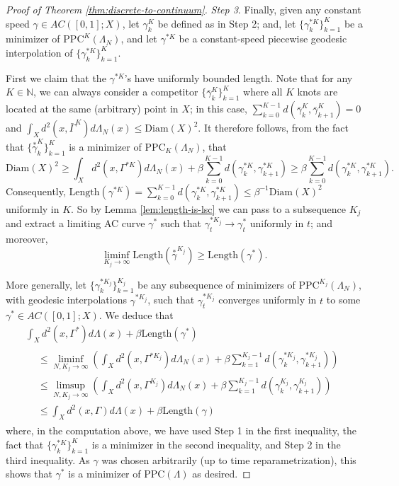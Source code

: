 \documentclass[aos, preprint]{imsart}
\theoremstyle{plain}
\theoremstyle{remark}
\begin{document}
\begin{appendix}
\begin{proof}[Proof of Theorem \ref{thm:discrete-to-continuum}]
\emph{Step 3}. Finally, given any constant speed $\gamma\in
AC([0,1];X)$, let $\gamma_{k}^{K}$ be defined as in Step 2; and, let
$\{\gamma_{k}^{*K}\}_{k=1}^{K}$ be a minimizer of
$\text{PPC}^{K}(\Lambda_{N})$, and let $\gamma^{*K}$ be a
constant-speed piecewise geodesic interpolation of
$\{\gamma_{k}^{*K}\}_{k=1}^{K}$.

First we claim that the $\gamma^{*K}$'s have uniformly bounded length. Note that for any $K\in\mathbb{N}$, we can always consider a competitor $\{\bar{\gamma}_k^K\}_{k=1}^K$ where
all $K$ knots are located at the same (arbitrary) point
in $X$; in this case,
$\sum_{k=0}^{K-1}d(\bar{\gamma}_{k}^{K},\bar{\gamma}_{k+1}^{K})=0$ and
$\int_{X}d^{2}(x,\bar\Gamma^{K})d\Lambda_{N}(x)\leq\text{Diam}(X)^{2}$. It
therefore follows, from the fact that
$\{\overset{*}{\gamma}_{k}^{K}\}_{k=1}^{K}$ is a minimizer of
$\text{PPC}_{K}(\Lambda_{N})$, that
\[
\text{Diam}(X)^{2}\geq\int_{X}d^{2}(x,\Gamma^{*K})d\Lambda_{N}(x)+\beta\sum_{k=0}^{K-1}d\left(\gamma_{k}^{*K},\gamma_{k+1}^{*K}\right)\geq\beta\sum_{k=0}^{K-1}d\left(\gamma_{k}^{*K},\gamma_{k+1}^{*K}\right).
\]
Consequently, $\text{Length}(\gamma^{*K})=\sum_{k=0}^{K-1}d\left(\gamma_{k}^{*K},\gamma_{k+1}^{*K}\right)\leq\beta^{-1}\text{Diam}(X)^{2}$
uniformly in $K$. So by Lemma \ref{lem:length-is-lsc} we can pass
to a subsequence $K_{j}$ and extract a limiting AC curve $\gamma^{*}$
such that $\gamma_{t}^{*K_{j}}\rightarrow\gamma_{t}^{*}$ uniformly
in $t$; and moreover,
\[
\liminf_{K_{j}\rightarrow\infty}\text{Length}(\overset{*}{\gamma}^{K_{j}})\geq\text{Length}(\gamma^{*}).
\]

More generally,
let $\{\gamma_{k}^{*K_{j}}\}_{k=1}^{K_{j}}$
be any subsequence of minimizers of $\text{PPC}^{K_{j}}(\Lambda_{N})$,
with geodesic interpolations $\gamma^{*K_{j}}$, such that
$\gamma_{t}^{*K_{j}}$ converges uniformly in $t$ to some
$\gamma^{*}\in AC([0,1];X)$. We deduce that
\begin{multline*}
\int_{X}d^{2}(x,\Gamma^{*})d\Lambda(x)+\beta\text{Length}(\gamma^{*}) \\
\begin{aligned}
& \leq\liminf_{N,K_{j}\rightarrow\infty}\left(\int_{X}d^{2}(x,\Gamma^{*K_{j}})d\Lambda_{N}(x)+\beta\sum_{k=1}^{K_{j}-1}d(\gamma_{k}^{*K_{j}},\gamma_{k+1}^{*K_{j}})\right)\\
 & \leq\limsup_{N,K_{j}\rightarrow\infty}\left(\int_{X}d^{2}(x,\Gamma^{K_{j}})d\Lambda_{N}(x)+\beta\sum_{k=1}^{K_{j}-1}d(\gamma_{k}^{K_{j}},\gamma_{k+1}^{K_{j}})\right)\\
 & \leq\int_{X}d^{2}(x,\Gamma)d\Lambda(x)+\beta\text{Length}(\gamma)
\end{aligned}
\end{multline*}
where, in the computation above, we have used Step 1 in the first
inequality, the fact that $\{\gamma_{k}^{*K}\}_{k=1}^{K}$ is a minimizer
in the second inequality, and Step 2 in the third inequality. As $\gamma$
was chosen arbitrarily (up to time reparametrization), this shows
that $\gamma^{*}$ is a minimizer of $\text{PPC}(\Lambda)$ as desired.
\end{proof}



\end{appendix}
\end{document}
